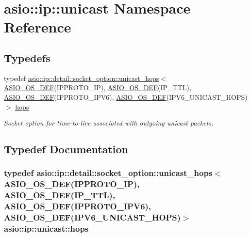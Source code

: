 \hypertarget{namespaceasio_1_1ip_1_1unicast}{}\section{asio\+:\+:ip\+:\+:unicast Namespace Reference}
\label{namespaceasio_1_1ip_1_1unicast}
\subsection*{Typedefs}
\begin{DoxyCompactItemize}
\item 
typedef \hyperlink{classasio_1_1ip_1_1detail_1_1socket__option_1_1unicast__hops}{asio\+::ip\+::detail\+::socket\+\_\+option\+::unicast\+\_\+hops}$<$ \hyperlink{socket__types_8hpp_a26e0208fa086ac48cf5af1b2a521c74a}{A\+S\+I\+O\+\_\+\+O\+S\+\_\+\+D\+E\+F}(I\+P\+P\+R\+O\+T\+O\+\_\+\+I\+P), \hyperlink{socket__types_8hpp_a26e0208fa086ac48cf5af1b2a521c74a}{A\+S\+I\+O\+\_\+\+O\+S\+\_\+\+D\+E\+F}(I\+P\+\_\+\+T\+T\+L), \hyperlink{socket__types_8hpp_a26e0208fa086ac48cf5af1b2a521c74a}{A\+S\+I\+O\+\_\+\+O\+S\+\_\+\+D\+E\+F}(I\+P\+P\+R\+O\+T\+O\+\_\+\+I\+P\+V6), \hyperlink{socket__types_8hpp_a26e0208fa086ac48cf5af1b2a521c74a}{A\+S\+I\+O\+\_\+\+O\+S\+\_\+\+D\+E\+F}(I\+P\+V6\+\_\+\+U\+N\+I\+C\+A\+S\+T\+\_\+\+H\+O\+P\+S)$>$ \hyperlink{namespaceasio_1_1ip_1_1unicast_a7ff48db5dc080e4267aef160fb680641}{hops}
\begin{DoxyCompactList}\small\item\em Socket option for time-\/to-\/live associated with outgoing unicast packets. \end{DoxyCompactList}\end{DoxyCompactItemize}


\subsection{Typedef Documentation}
\hypertarget{namespaceasio_1_1ip_1_1unicast_a7ff48db5dc080e4267aef160fb680641}{}
\subsubsection[{hops}]{\setlength{\rightskip}{0pt plus 5cm}typedef {\bf asio\+::ip\+::detail\+::socket\+\_\+option\+::unicast\+\_\+hops}$<$ {\bf A\+S\+I\+O\+\_\+\+O\+S\+\_\+\+D\+E\+F}(I\+P\+P\+R\+O\+T\+O\+\_\+\+I\+P), {\bf A\+S\+I\+O\+\_\+\+O\+S\+\_\+\+D\+E\+F}(I\+P\+\_\+\+T\+T\+L), {\bf A\+S\+I\+O\+\_\+\+O\+S\+\_\+\+D\+E\+F}(I\+P\+P\+R\+O\+T\+O\+\_\+\+I\+P\+V6), {\bf A\+S\+I\+O\+\_\+\+O\+S\+\_\+\+D\+E\+F}(I\+P\+V6\+\_\+\+U\+N\+I\+C\+A\+S\+T\+\_\+\+H\+O\+P\+S)$>$ {\bf asio\+::ip\+::unicast\+::hops}}\label{namespaceasio_1_1ip_1_1unicast_a7ff48db5dc080e4267aef160fb680641}


